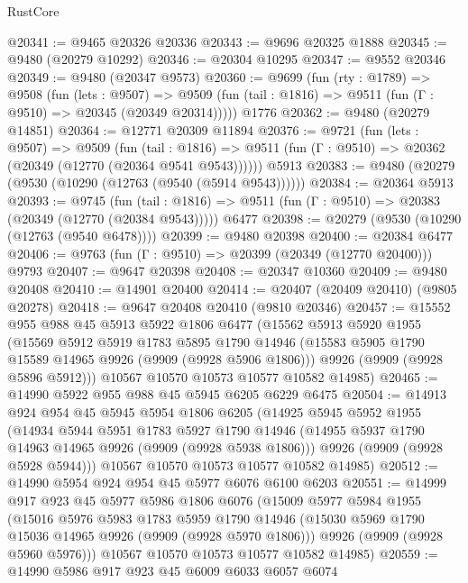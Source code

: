 \begin{lexlean}{RustCore}
\begin{coremodule}
@20341 := @9465 @20326 @20336
@20343 := @9696 @20325 @1888
@20345 := @9480 (@20279 @10292)
@20346 := @20304 @10295
@20347 := @9552 @20346
@20349 := @9480 (@20347 @9573)
@20360 := @9699
    (fun (rty : @1789) =>
    @9508
      (fun (lets : @9507) =>
      @9509 (fun (tail : @1816) => @9511 (fun (Γ : @9510) => @20345 (@20349 @20314)))))
    @1776
@20362 := @9480 (@20279 @14851)
@20364 := @12771 @20309 @11894
@20376 := @9721
    (fun (lets : @9507) =>
    @9509
      (fun (tail : @1816) =>
      @9511 (fun (Γ : @9510) => @20362 (@20349 (@12770 (@20364 @9541 @9543))))))
    @5913
@20383 := @9480 (@20279 (@9530 (@10290 (@12763 (@9540 (@5914 @9543))))))
@20384 := @20364 @5913
@20393 := @9745
    (fun (tail : @1816) => @9511 (fun (Γ : @9510) => @20383 (@20349 (@12770 (@20384 @9543)))))
    @6477
@20398 := @20279 (@9530 (@10290 (@12763 (@9540 @6478))))
@20399 := @9480 @20398
@20400 := @20384 @6477
@20406 := @9763 (fun (Γ : @9510) => @20399 (@20349 (@12770 @20400))) @9793
@20407 := @9647 @20398
@20408 := @20347 @10360
@20409 := @9480 @20408
@20410 := @14901 @20400
@20414 := @20407 (@20409 @20410) (@9805 @20278)
@20418 := @9647 @20408 @20410 (@9810 @20346)
@20457 := @15552
    @955
    @988
    @45
    @5913
    @5922
    @1806
    @6477
    (@15562
      @5913
      @5920
      @1955
      (@15569
        @5912
        @5919
        @1783
        @5895
        @1790
        @14946
        (@15583 @5905 @1790 @15589 @14965 @9926 (@9909 (@9928 @5906 @1806)))
        @9926
        (@9909 (@9928 @5896 @5912)))
      @10567
      @10570
      @10573
      @10577
      @10582
      @14985)
@20465 := @14990 @5922 @955 @988 @45 @5945 @6205 @6229 @6475
@20504 := @14913
    @924
    @954
    @45
    @5945
    @5954
    @1806
    @6205
    (@14925
      @5945
      @5952
      @1955
      (@14934
        @5944
        @5951
        @1783
        @5927
        @1790
        @14946
        (@14955 @5937 @1790 @14963 @14965 @9926 (@9909 (@9928 @5938 @1806)))
        @9926
        (@9909 (@9928 @5928 @5944)))
      @10567
      @10570
      @10573
      @10577
      @10582
      @14985)
@20512 := @14990 @5954 @924 @954 @45 @5977 @6076 @6100 @6203
@20551 := @14999
    @917
    @923
    @45
    @5977
    @5986
    @1806
    @6076
    (@15009
      @5977
      @5984
      @1955
      (@15016
        @5976
        @5983
        @1783
        @5959
        @1790
        @14946
        (@15030 @5969 @1790 @15036 @14965 @9926 (@9909 (@9928 @5970 @1806)))
        @9926
        (@9909 (@9928 @5960 @5976)))
      @10567
      @10570
      @10573
      @10577
      @10582
      @14985)
@20559 := @14990 @5986 @917 @923 @45 @6009 @6033 @6057 @6074

\end{coremodule}
\end{lexlean}
